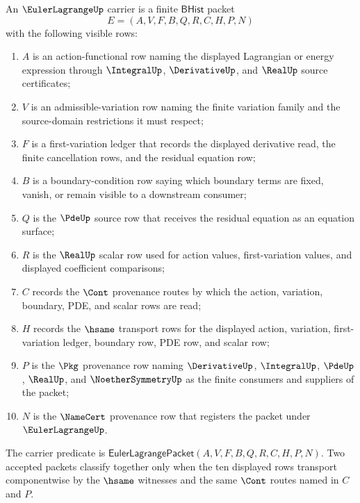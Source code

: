 \begin{definition}
\label{def:eulerlagrange-bhist-carrier}
An $\EulerLagrangeUp$ carrier is a finite $\mathsf{BHist}$ packet
$$
E=(A,V,F,B,Q,R,C,H,P,N)
$$
with the following visible rows:
\begin{enumerate}
\item $A$ is an action-functional row naming the displayed Lagrangian or energy expression through $\IntegralUp$, $\DerivativeUp$, and $\RealUp$ source certificates;
\item $V$ is an admissible-variation row naming the finite variation family and the source-domain restrictions it must respect;
\item $F$ is a first-variation ledger that records the displayed derivative read, the finite cancellation rows, and the residual equation row;
\item $B$ is a boundary-condition row saying which boundary terms are fixed, vanish, or remain visible to a downstream consumer;
\item $Q$ is the $\PdeUp$ source row that receives the residual equation as an equation surface;
\item $R$ is the $\RealUp$ scalar row used for action values, first-variation values, and displayed coefficient comparisons;
\item $C$ records the $\Cont$ provenance routes by which the action, variation, boundary, PDE, and scalar rows are read;
\item $H$ records the $\hsame$ transport rows for the displayed action, variation, first-variation ledger, boundary row, PDE row, and scalar row;
\item $P$ is the $\Pkg$ provenance row naming $\DerivativeUp$, $\IntegralUp$, $\PdeUp$, $\RealUp$, and $\NoetherSymmetryUp$ as the finite consumers and suppliers of the packet;
\item $N$ is the $\NameCert$ provenance row that registers the packet under $\EulerLagrangeUp$.
\end{enumerate}
The carrier predicate is $\mathsf{EulerLagrangePacket}(A,V,F,B,Q,R,C,H,P,N)$. Two accepted packets classify together only when the ten displayed rows transport componentwise by the $\hsame$ witnesses and the same $\Cont$ routes named in $C$ and $P$.
\end{definition}

